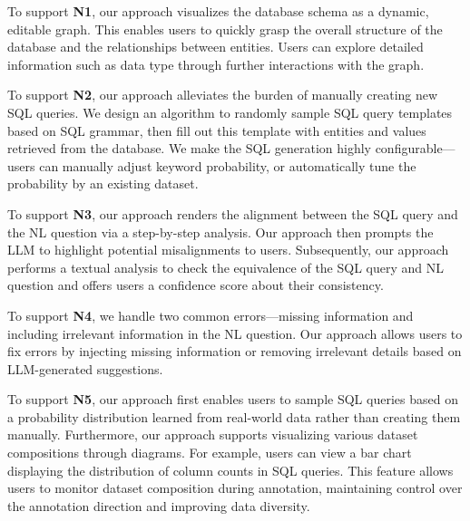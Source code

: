 To support \textbf{N1}, our approach visualizes the database schema as a dynamic, editable graph. This enables users to quickly grasp the overall structure of the database and the relationships between entities. Users can explore detailed information such as data type through further interactions with the graph.


To support \textbf{N2}, our approach alleviates the burden of manually creating new SQL queries. We design an algorithm to randomly sample SQL query templates based on SQL grammar, then fill out this template with entities and values retrieved from the database. We make the SQL generation highly configurable---users can manually adjust keyword probability, or automatically tune the probability by an existing dataset.

To support \textbf{N3}, our approach renders the alignment between the SQL query and the NL question via a step-by-step analysis. Our approach then prompts the LLM to highlight potential misalignments to users.
Subsequently, our approach performs a textual analysis to check the equivalence of the SQL query and NL question and offers users a confidence score about their consistency.

To support \textbf{N4}, we handle two common errors---missing information and including irrelevant information in the NL question. Our approach allows users to fix errors by injecting missing information or removing irrelevant details based on LLM-generated suggestions.

To support \textbf{N5}, our approach first enables users to sample SQL queries based on a probability distribution learned from real-world data rather than creating them manually. 
Furthermore, our approach supports visualizing various dataset compositions through diagrams. 
For example, users can view a bar chart displaying the distribution of column counts in SQL queries. This feature allows users to monitor dataset composition during annotation, maintaining control over the annotation direction and improving data diversity.


